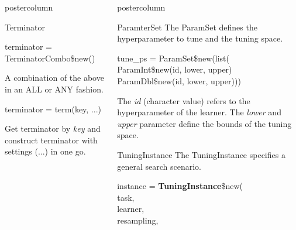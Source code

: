 \documentclass{beamer}
\newlength{\columnheight} %
\begin{document}
\begin{frame}[fragile]{}
\begin{columns}
\begin{column}{.245\textwidth}
\begin{beamercolorbox}[center]{postercolumn}
\begin{minipage}{.98\textwidth}
{\begin{myblock}{Terminator}
						\\
						\begin{codebox}
							terminator = TerminatorCombo\$new()
						\end{codebox}
						A combination of the above in an ALL or ANY fashion.
						\\
						\begin{codebox}
							terminator = term(key, ...)
						\end{codebox}
						Get terminator by \textit{key} and construct terminator with settings (...) in one go. 
					\end{myblock}	
					\vfill}
				\end{minipage}
			\end{beamercolorbox}
		\end{column}
		\begin{column}{.245\textwidth}
			\begin{beamercolorbox}[center]{postercolumn}
				\begin{minipage}{.98\textwidth}
					\parbox[t][\columnheight]{\textwidth}{
						\begin{myblock}{ParamterSet}
						The ParamSet defines the hyperparameter to tune and the tuning space.
							\\
							\begin{codeboxmultiline}[width=18cm]
								tune\_ps = ParamSet\$new(list(\\
								\hspace*{1ex}ParamInt\$new(id, lower, upper)\\
								\hspace*{1ex}ParamDbl\$new(id, lower, upper)))
							\end{codeboxmultiline}
					The \textit{id} (character value) refers to the hyperparameter of the learner. The \textit{lower} and \textit{upper} parameter define the bounds of the tuning space. 	
						\end{myblock}	
					\begin{myblock}{TuningInstance}
						The TuningInstance specifies a general search scenario.
						\\
						\begin{codeboxmultiline}[width=18cm]
							instance = \textbf{TuningInstance}\$new(\\
							\hspace*{1ex}task,\\
							\hspace*{1ex}learner,\\
							\hspace*{1ex}resampling,\\

\end{codeboxmultiline}
\end{myblock}}
\end{minipage}
\end{beamercolorbox}
\end{column}
\end{columns}
\end{frame}
\end{document}
